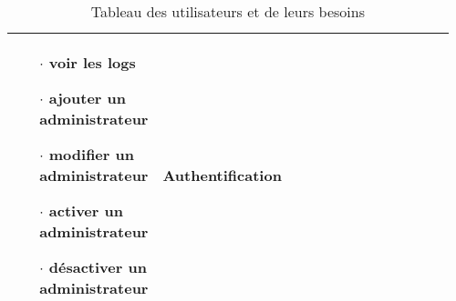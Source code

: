 \begin{table}
\begin{tabular}{|p{0.21\linewidth}|p{0.54\linewidth}|p{0.21\linewidth}|}
\begin{itemize}
                                \item[$\cdot$]  voir les logs
                                \item[$\cdot$]  ajouter un administrateur
                                \item[$\cdot$]  modifier un administrateur
                                \item[$\cdot$]  activer un administrateur
                                \item[$\cdot$]  désactiver un administrateur
                        \end{itemize} & 
                        Authentification \\
                \hline 
        \end{tabular}
        \caption{Tableau des utilisateurs et de leurs besoins} \label{tab:sometab}
\end{table}
\par
